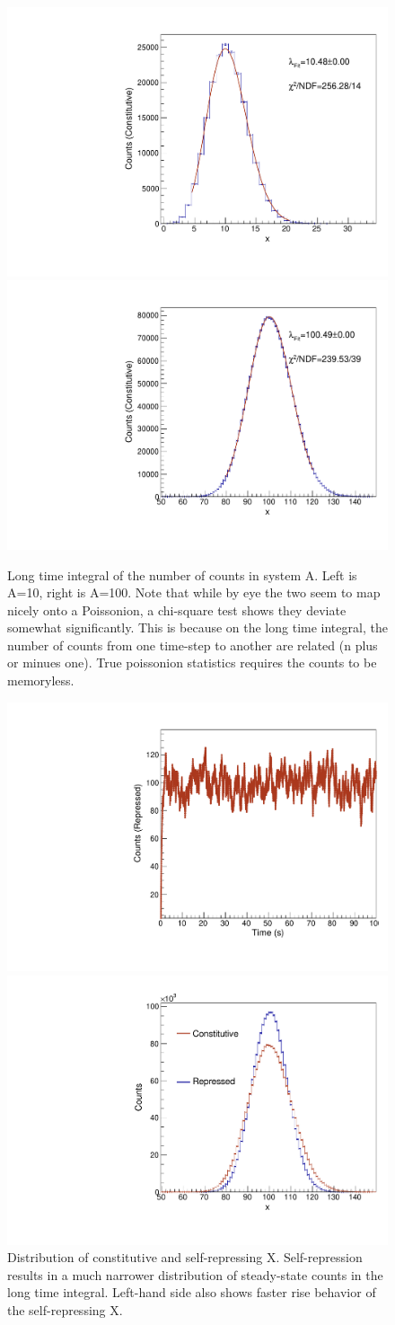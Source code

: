 \documentclass{article}
\begin{document}
\begin{figure}[H]
    \centering
    \includegraphics[width=.49\textwidth]{canv10_2.pdf} 
    \includegraphics[width=.49\textwidth]{canv100_2.pdf} 
    \caption{Long time integral of the number of counts in system A. Left is A=10, right is A=100. Note that while by eye the two seem to map nicely onto a Poissonion, a chi-square test shows they deviate somewhat significantly. This is because on the long time integral, the number of counts from one time-step to another are related (n plus or minues one). True poissonion statistics requires the counts to be memoryless.}
    \label{fig2}
\end{figure}

\begin{figure}[H]
    \centering
    \includegraphics[width=.49\textwidth]{canv100K.pdf} 
    
    \includegraphics[width=.49\textwidth]{canv100K_2.pdf} 
    \caption{Distribution of constitutive and self-repressing X. Self-repression results in a much narrower distribution of steady-state counts in the long time integral. Left-hand side also shows faster rise behavior of the self-repressing X.}
    \label{fig3}
\end{figure}
\end{document}
